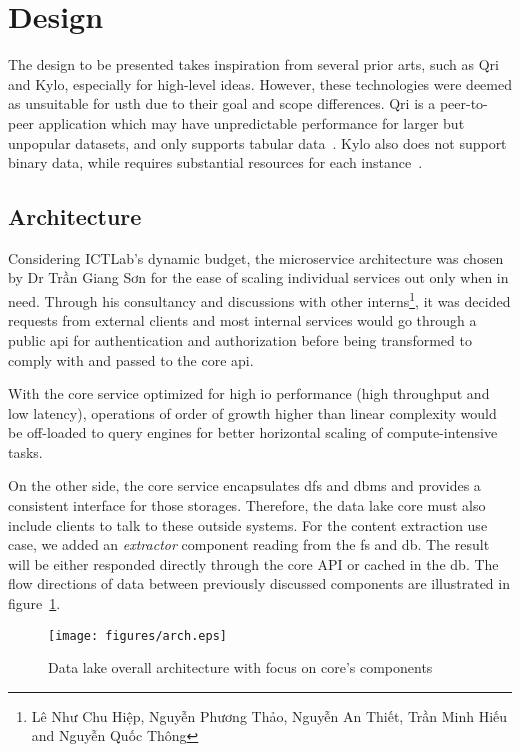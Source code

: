 \section{Design}
The design to be presented takes inspiration from several prior arts, such as
Qri and Kylo, especially for high-level ideas.  However, these technologies were
deemed as unsuitable for \gls{usth} due to their goal and scope differences.
Qri is a peer-to-peer application which may have unpredictable performance
for larger but unpopular datasets, and only supports tabular data~\cite{qri}.
Kylo also does not support binary data, while requires substantial resources
for each instance~\cite{kylo}.

\subsection{Architecture}
Considering ICTLab's dynamic budget, the microservice architecture was chosen
by Dr {Trần Giang Sơn} for the ease of scaling
individual services out only when in need.  Through his consultancy
and discussions with other interns\footnote{Lê
Như Chu Hiệp, Nguyễn Phương Thảo, Nguyễn An Thiết, Trần Minh Hiếu
and Nguyễn Quốc Thông}, it was decided requests from external clients
and most internal services would go through a public \gls{api} for
authentication and authorization before being transformed to comply with
and passed to the core \gls{api}.

With the core service optimized for high \gls{io} performance (high throughput
and low latency), operations of order of growth higher than linear complexity
would be off-loaded to query engines for better horizontal scaling
of compute-intensive tasks.

On the other side, the core service encapsulates \gls{dfs} and \gls{dbms}
and provides a consistent interface for those storages.  Therefore,
the data lake core must also include clients to talk to these outside systems.
For the content extraction use case, we added an \emph{extractor} component
reading from the \gls{fs} and \gls{db}.  The result will be either responded
directly through the core API or cached in the \gls{db}.  The flow directions
of data between previously discussed components are illustrated
in figure~\ref{arch}.

\begin{figure}\centering
  \texttt{[image: figures/arch.eps]}
  \caption{Data lake overall architecture with focus on core's components}
  \label{arch}
\end{figure}

